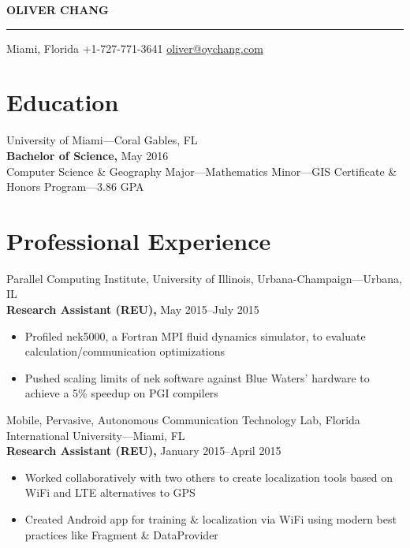 \documentclass[letterpaper,12pt]{article}
\def\name{Oliver Chang}
\begin{document}
{\centering
  \Huge
    \textbf{\MakeUppercase{\name}}\\
}

\vskip 3mm
\hrule
\vskip 1mm

{\centering
  \normalsize
    \null\hfill%
      Miami, Florida \hfill
      +1-727-771-3641 \hfill
      \href{mailto:oliver@oychang.com}{oliver@oychang.com}
    \hfill\null\\
}

\section*{Education}
University of Miami---Coral Gables, FL\\
\textbf{Bachelor of Science,} May 2016\\
Computer Science \& Geography Major---Mathematics Minor---GIS Certificate \& Honors Program---3.86 GPA

\vskip 3.5mm

\section*{Professional Experience}

Parallel Computing Institute, University of Illinois, Urbana-Champaign---Urbana, IL\\
\textbf{Research Assistant (REU),} May 2015--July 2015
\begin{itemize}
  \item Profiled nek5000, a Fortran MPI fluid dynamics simulator, to evaluate calculation/communication optimizations
  \item Pushed scaling limits of nek software against Blue Waters' hardware to achieve a 5\% speedup on PGI compilers
\end{itemize}

\vskip 1.5mm

Mobile, Pervasive, Autonomous Communication Technology Lab, Florida International University---Miami, FL\\
\textbf{Research Assistant (REU),} January 2015--April 2015
\begin{itemize}
  \item Worked collaboratively with two others to create localization tools based on WiFi and LTE alternatives to GPS
  \item Created Android app for training \& localization via WiFi using modern best practices like Fragment \& DataProvider
\end{itemize}
\end{document}

